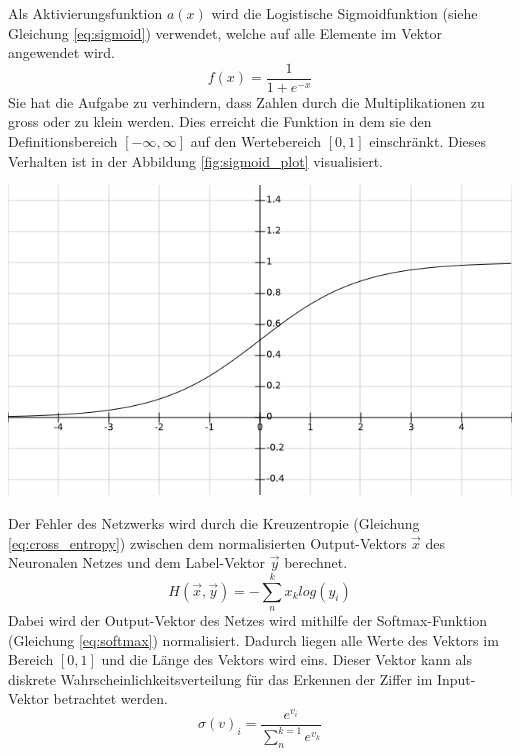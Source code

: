 \documentclass[Interploate_hadwritten_Digits.tex.tex]{subfiles}
\begin{document}
	Als Aktivierungsfunktion $ a(x) $ wird die Logistische Sigmoidfunktion (siehe Gleichung \ref{eq:sigmoid}) verwendet, welche auf alle Elemente im Vektor angewendet wird. 
	\begin{equation}
	f(x)=\frac{1}{1+e^{-x}}
	\label{eq:sigmoid}
	\end{equation}
	Sie hat die Aufgabe zu verhindern, dass Zahlen durch die Multiplikationen zu gross oder zu klein werden. Dies erreicht die Funktion in dem sie den Definitionsbereich $ [-\infty, \infty] $ auf den Wertebereich $ [0, 1] $ einschränkt. Dieses Verhalten ist in der Abbildung \ref{fig:sigmoid_plot} visualisiert.
	\begin{Figure}
		\centering
		\includegraphics[width=\linewidth]{img/sigmoid_plot.png}
		\label{fig:sigmoid_plot}
	\end{Figure}

	Der Fehler des Netzwerks wird durch die Kreuzentropie (Gleichung \ref{eq:cross_entropy}) zwischen dem normalisierten Output-Vektors $ \vec{x} $ des Neuronalen Netzes und dem Label-Vektor $ \vec{y} $ berechnet.
	\begin{equation}
	H(\vec{x}, \vec{y}) = -\sum_{n}^{k}x_{k}log(y_{i})
	\label{eq:cross_entropy}
	\end{equation}
	Dabei wird der Output-Vektor des Netzes wird mithilfe der Softmax-Funktion (Gleichung \ref{eq:softmax}) normalisiert. Dadurch liegen alle Werte des Vektors im Bereich $ [0, 1] $ und die Länge des Vektors wird eins. Dieser Vektor kann als diskrete Wahrscheinlichkeitsverteilung für das Erkennen der Ziffer im Input-Vektor betrachtet werden.
	\begin{equation}
	\sigma(v)_{i} = \frac{e^{v_{i}}}{\sum_{n}^{k=1}e^{v_{k}}}
	\label{eq:softmax}
	\end{equation}
	
\end{document}
